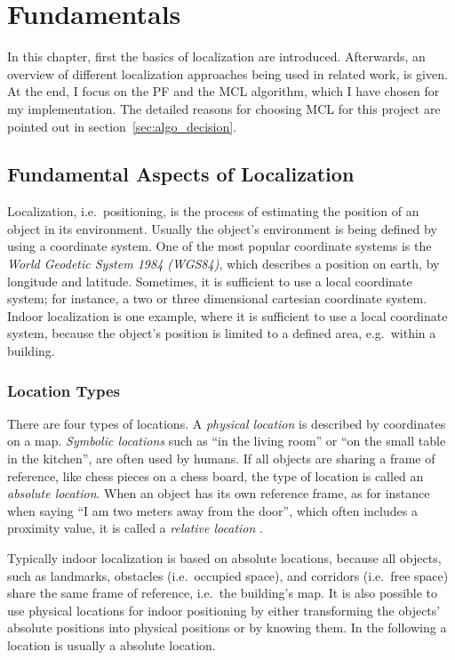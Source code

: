 \chapter{Fundamentals}\label{chap:fundamentals}

In this chapter, first the basics of localization are introduced. Afterwards, an overview of different localization approaches being used in related work, is given. At the end, I focus on the \acl{PF} and the \acl{MCL} algorithm, which I have chosen for my implementation. The detailed reasons for choosing \acs{MCL} for this project are pointed out in section~\ref{sec:algo_decision}.

\section{Fundamental Aspects of Localization}\label{sec:fund_loc}

Localization, i.e.\ positioning, is the process of estimating the position of an object in its environment. Usually the object's environment is being defined by using a coordinate system. One of the most popular coordinate systems is the \emph{World Geodetic System 1984 (WGS84)}, which describes a position on earth, by longitude and latitude. Sometimes, it is sufficient to use a local coordinate system; for instance, a two or three dimensional cartesian coordinate system. Indoor localization is one example, where it is sufficient to use a local coordinate system, because the object's position is limited to a defined area, e.g.\ within a building.

\subsection{Location Types}
There are four types of locations. A \emph{physical location} is described by coordinates on a map. \emph{Symbolic locations} such as ``in the living room'' or ``on the small table in the kitchen'', are often used by humans. If all objects are sharing a frame of reference, like chess pieces on a chess board, the type of location is called an \emph{absolute location}. When an object has its own reference frame, as for instance when saying ``I am two meters away from the door'', which often includes a proximity value, it is called a \emph{relative location} \citep{IEEE:survey_wireless_indoor_pos}.

Typically indoor localization is based on absolute locations, because all objects, such as landmarks, obstacles (i.e.\ occupied space), and corridors (i.e.\ free space) share the same frame of reference, i.e.\ the building's map. It is also possible to use physical locations for indoor positioning by either transforming the objects' absolute positions into physical positions or by knowing them. In the following a location is usually a absolute location.

